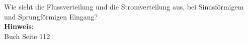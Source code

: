 \begin{question}[section=4,subsection=42,name={Diffusion magnetischer Felder},difficulty=7,type=mdl,mode=exm,tags={}]
	Wie sieht die Flussverteilung und die Stromverteilung aus, bei Sinusförmigem und Sprungförmigen Eingang?
	\\ \textbf{Hinweis:}\\
	Buch Seite 112
\end{question}
\begin{solution}
	
\end{solution}